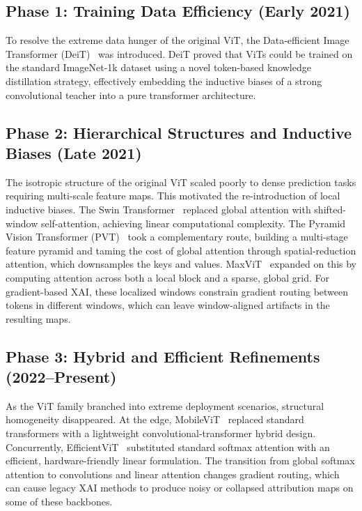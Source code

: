 \documentclass[final,5p,times,twocolumn]{elsarticle}
\begin{document}
\subsection{Phase 1: Training Data Efficiency (Early 2021)}
To resolve the extreme data hunger of the original ViT, the Data-efficient Image Transformer (DeiT)~\cite{touvron2021deit} was introduced. DeiT proved that ViTs could be trained on the standard ImageNet-1k dataset using a novel token-based knowledge distillation strategy, effectively embedding the inductive biases of a strong convolutional teacher into a pure transformer architecture. 

\subsection{Phase 2: Hierarchical Structures and Inductive Biases (Late 2021)}
The isotropic structure of the original ViT scaled poorly to dense prediction tasks requiring multi-scale feature maps. This motivated the re-introduction of local inductive biases. The Swin Transformer~\cite{liu2021swin} replaced global attention with shifted-window self-attention, achieving linear computational complexity. The Pyramid Vision Transformer (PVT)~\cite{wang2021pvt} took a complementary route, building a multi-stage feature pyramid and taming the cost of global attention through spatial-reduction attention, which downsamples the keys and values. MaxViT~\cite{tu2022maxvit} expanded on this by computing attention across both a local block and a sparse, global grid. For gradient-based XAI, these localized windows constrain gradient routing between tokens in different windows, which can leave window-aligned artifacts in the resulting maps.

\subsection{Phase 3: Hybrid and Efficient Refinements (2022--Present)}
As the ViT family branched into extreme deployment scenarios, structural homogeneity disappeared. At the edge, MobileViT~\cite{mehta2022mobilevit} replaced standard transformers with a lightweight convolutional-transformer hybrid design. Concurrently, EfficientViT~\cite{cai2023efficientvit} substituted standard softmax attention with an efficient, hardware-friendly linear formulation. The transition from global softmax attention to convolutions and linear attention changes gradient routing, which can cause legacy XAI methods to produce noisy or collapsed attribution maps on some of these backbones.
\end{document}
